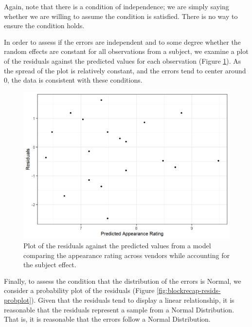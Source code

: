 \documentclass[
]{book}
\theoremstyle{plain}
\theoremstyle{mydefn}
\theoremstyle{myexmpl}
\theoremstyle{remark}
\begin{document}
Again, note that there is a condition of independence; we are simply saying whether we are willing to assume the condition is satisfied. There is no way to ensure the condition holds.

In order to assess if the errors are independent and to some degree whether the random effects are constant for all observations from a subject, we examine a plot of the residuals against the predicted values for each observation (Figure \ref{fig:blockrecap-resids}). As the spread of the plot is relatively constant, and the errors tend to center around 0, the data is consistent with these conditions.

\begin{figure}

{\centering \includegraphics[width=0.8\linewidth]{./Images/blockrecap-resids-1} 

}

\caption{Plot of the residuals against the predicted values from a model comparing the appearance rating across vendors while accounting for the subject effect.}\label{fig:blockrecap-resids}
\end{figure}

Finally, to assess the condition that the distribution of the errors is Normal, we consider a probability plot of the residuals (Figure \ref{fig:blockrecap-resids-probplot}). Given that the residuals tend to display a linear relationship, it is reasonable that the residuals represent a sample from a Normal Distribution. That is, it is reasonable that the errors follow a Normal Distribution.
\end{document}
